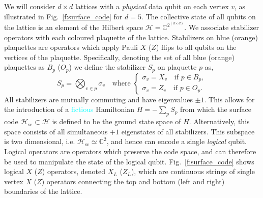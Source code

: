 \documentclass[twocolumn,preprintnumbers,amsmath,amssymb,notitlepage,nofootinbib,longbibliography,superscriptaddress,aps,pra,10pt]{revtex4-1}
\newcommand{\je}[1]{\textcolor{cyan}{#1}}
\begin{document}
	We will consider $d\times d$ lattices with a \textit{physical} data qubit on each vertex $v$, as illustrated in Fig.~\ref{f:surface_code} for $d=5$.
	The collective state of all qubits on the lattice is an element of the Hilbert space $\mathcal{H} = \mathbb{C}^{2^{(d\times d)}}$.
	We associate stabilizer operators with each coloured plaquette of the lattice.
	Stabilizers on blue (orange) plaquettes are operators which apply Pauli $X$ ($Z$) flips to all qubits on the vertices of the plaquette.
	Specifically, denoting the set of all blue (orange) plaquettes as $B_p$ ($O_p$) we define the stabilizer $S_p$ on plaquette $p$ as,
	\begin{equation}\label{e:stabilizer_definition}
		S_p = \bigotimes_{v\in p} \sigma_v \quad \text{where }
		\begin{cases}
			\sigma_v = X_v \quad \text{if } p \in B_p,\\
			\sigma_v = Z_v \quad \text{if } p \in O_p.
		\end{cases}
	\end{equation}
	All stabilizers are mutually commuting and have eigenvalues $\pm 1$.
	This allows for the introduction of a \je{fictious} Hamiltonian $H = -\sum_p S_p$ from which the surface code $\mathcal{H}_\mathrm{sc} \subset \mathcal{H}$ is defined to be the ground state space of $H$.
	Alternatively, this space consists of all simultaneous $+1$ eigenstates of all stabilizers.
	This subspace is two dimensional, i.e. $\mathcal{H}_\mathrm{sc} \simeq \mathbb{C}^2$, and hence can encode a single \textit{logical} qubit.
	Logical operators are operators which preserve the code space, and can therefore be used to manipulate the state of the logical qubit.
	Fig.~\ref{f:surface_code} shows logical $X$ ($Z$) operators, denoted $X_L$ ($Z_L$), which are continuous strings of single vertex $X$ ($Z$) operators connecting the top and bottom (left and right) boundaries of the lattice.
\end{document}
